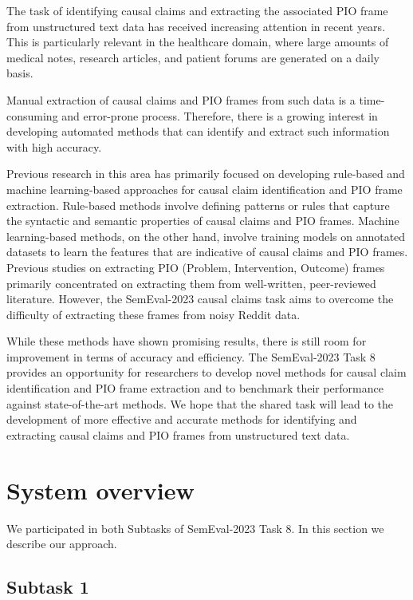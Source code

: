 \documentclass[11pt]{article}
\begin{document}
The task of identifying causal claims and extracting the associated PIO frame from unstructured text data has received increasing attention in recent years. This is particularly relevant in the healthcare domain, where large amounts of medical notes, research articles, and patient forums are generated on a daily basis.

Manual extraction of causal claims and PIO frames from such data is a time-consuming and error-prone process. Therefore, there is a growing interest in developing automated methods that can identify and extract such information with high accuracy.

Previous research in this area has primarily focused on developing rule-based and machine learning-based approaches for causal claim identification and PIO frame extraction. Rule-based methods involve defining patterns or rules that capture the syntactic and semantic properties of causal claims and PIO frames. Machine learning-based methods, on the other hand, involve training models on annotated datasets to learn the features that are indicative of causal claims and PIO frames.
Previous studies on extracting PIO (Problem, Intervention, Outcome) frames primarily concentrated on extracting them from well-written, peer-reviewed literature. However, the SemEval-2023 causal claims task aims to overcome the difficulty of extracting these frames from noisy Reddit data.

While these methods have shown promising results, there is still room for improvement in terms of accuracy and efficiency. The SemEval-2023 Task 8 provides an opportunity for researchers to develop novel methods for causal claim identification and PIO frame extraction and to benchmark their performance against state-of-the-art methods. We hope that the shared task will lead to the development of more effective and accurate methods for identifying and extracting causal claims and PIO frames from unstructured text data.





\section{System overview}

We participated in both Subtasks of SemEval-2023 Task 8. 
In this section we describe our approach.

\subsection{Subtask 1} \label{sec:system1}
\end{document}
